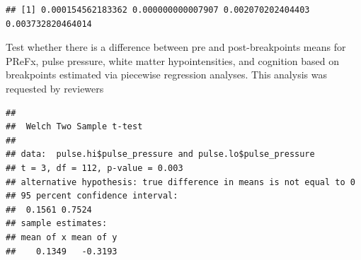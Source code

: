 \documentclass[
]{article}
\newenvironment{Shaded}{\begin{snugshade}}{\end{snugshade}}
\newcommand{\AttributeTok}[1]{\textcolor[rgb]{0.13,0.29,0.53}{#1}}
\newcommand{\CommentTok}[1]{\textcolor[rgb]{0.56,0.35,0.01}{\textit{#1}}}
\newcommand{\ConstantTok}[1]{\textcolor[rgb]{0.56,0.35,0.01}{#1}}
\newcommand{\DecValTok}[1]{\textcolor[rgb]{0.00,0.00,0.81}{#1}}
\newcommand{\FloatTok}[1]{\textcolor[rgb]{0.00,0.00,0.81}{#1}}
\newcommand{\FunctionTok}[1]{\textcolor[rgb]{0.13,0.29,0.53}{\textbf{#1}}}
\newcommand{\NormalTok}[1]{#1}
\newcommand{\OtherTok}[1]{\textcolor[rgb]{0.56,0.35,0.01}{#1}}
\newcommand{\SpecialCharTok}[1]{\textcolor[rgb]{0.81,0.36,0.00}{\textbf{#1}}}
\newcommand{\StringTok}[1]{\textcolor[rgb]{0.31,0.60,0.02}{#1}}
\begin{document}
\begin{Shaded}
\end{Shaded}

\begin{verbatim}
## [1] 0.000154562183362 0.000000000007907 0.002070202404403 0.003732820464014
\end{verbatim}

Test whether there is a difference between pre and post-breakpoints
means for PReFx, pulse pressure, white matter hypointensities, and
cognition based on breakpoints estimated via piecewise regression
analyses. This analysis was requested by reviewers

\begin{Shaded}
\end{Shaded}

\begin{verbatim}
## 
##  Welch Two Sample t-test
## 
## data:  pulse.hi$pulse_pressure and pulse.lo$pulse_pressure
## t = 3, df = 112, p-value = 0.003
## alternative hypothesis: true difference in means is not equal to 0
## 95 percent confidence interval:
##  0.1561 0.7524
## sample estimates:
## mean of x mean of y 
##    0.1349   -0.3193
\end{verbatim}
\end{document}

